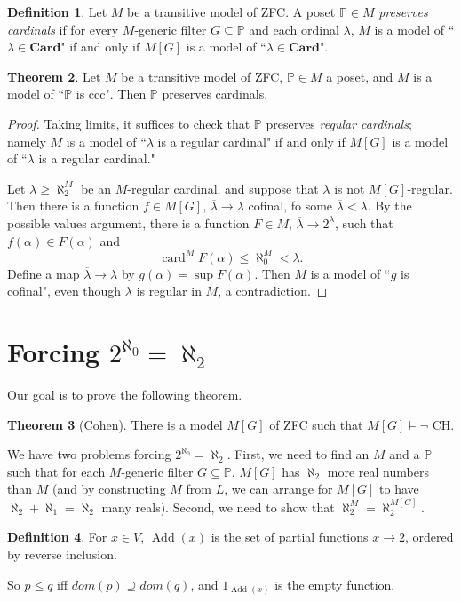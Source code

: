 \documentclass[12pt]{report}
\newcommand{\PP}{\mathbb{P}}
\newcommand{\card}{\operatorname{card}}
\newcommand{\Card}{\mathbf{Card}}
\DeclareMathOperator{\Add}{Add}
\newcommand{\dfn}[1]{\emph{#1}\index{#1}}
\theoremstyle{definition}
\newtheorem{theorem}{Theorem}[chapter]
\newtheorem{definition}[theorem]{Definition}
\begin{document}
\begin{definition}
    Let $M$ be a transitive model of ZFC. A poset $\PP \in M$ \dfn{preserves cardinals} if for every $M$-generic filter $G \subseteq \PP$ and each ordinal $\lambda$, $M$ is a model of ``$\lambda \in \Card$" if and only if $M[G]$ is a model of ``$\lambda \in \Card$".
\end{definition}
\begin{theorem}
    Let $M$ be a transitive model of ZFC, $\PP \in M$ a poset, and $M$ is a model of ``$\PP$ is ccc". Then $\PP$ preserves cardinals.
\end{theorem}
\begin{proof}
    Taking limits, it suffices to check that $\PP$ preserves \emph{regular cardinals}; namely $M$ is a model of ``$\lambda$ is a regular cardinal" if and only if $M[G]$ is a model of ``$\lambda$ is a regular cardinal."

    Let $\lambda \geq \aleph_2^M$ be an $M$-regular cardinal, and suppose that $\lambda$ is not $M[G]$-regular. Then there is a function $f \in M[G]$, $\overline \lambda \to \lambda$ cofinal, fo some $\overline \lambda < \lambda$. By the possible values argument, there is a function $F \in M$, $\overline \lambda \to 2^\lambda$, such that $f(\alpha) \in F(\alpha)$ and
    $$\card^M F(\alpha) \leq \aleph_0^M < \lambda.$$
    Define a map $\overline \lambda \to \lambda$ by $g(\alpha) = \sup F(\alpha)$. Then $M$ is a model of ``$g$ is cofinal", even though $\lambda$ is regular in $M$, a contradiction.
\end{proof}




\section{Forcing $2^{\aleph_0} = \aleph_2$}
Our goal is to prove the following theorem.
\begin{theorem}[Cohen]
There is a model $M[G]$ of ZFC such that $M[G] \models \neg$ CH.
\end{theorem}

We have two problems forcing $2^{\aleph_0} = \aleph_2$. First, we need to find an $M$ and a $\PP$ such that for each $M$-generic filter $G \subseteq \PP$, $M[G]$ has $\aleph_2$ more real numbers than $M$ (and by constructing $M$ from $L$, we can arrange for $M[G]$ to have $\aleph_2 + \aleph_1 = \aleph_2$ many reals). Second, we need to show that $\aleph_2^M = \aleph_2^{M[G]}$.

\begin{definition}
    For $x \in V$,
    $\Add(x)$ is the set of partial functions $x \to 2$, ordered by reverse inclusion.
\end{definition}
So $p \leq q$ iff $dom(p) \supseteq dom(q)$, and $1_{\Add(x)}$ is the empty function.
\end{document}
